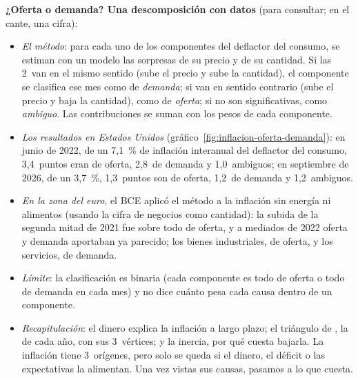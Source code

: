 \documentclass[11pt]{article}
\begin{document}
\begin{anotaciones}
\textbf{¿Oferta o demanda? Una descomposición con datos} (para consultar; en el cante, una cifra):
\begin{itemize}
\item \emph{El método}\nocite{Shapiro2022Oferta}: para cada uno de los componentes del deflactor del consumo, se estiman con un modelo las sorpresas de su precio y de su cantidad. Si las 2~van en el mismo sentido (sube el precio y sube la cantidad), el componente se clasifica ese mes como de \emph{demanda}; si van en sentido contrario (sube el precio y baja la cantidad), como de \emph{oferta}; si no son significativas, como \emph{ambiguo}. Las contribuciones se suman con los pesos de cada componente.
\item \emph{Los resultados en Estados Unidos} (gráfico~\ref{fig:inflacion-oferta-demanda}): en junio de 2022, de un 7,1~\% de inflación interanual del deflactor del consumo, 3,4~puntos eran de oferta, 2,8~de demanda y 1,0~ambiguos; en septiembre de 2026, de un 3,7~\%, 1,3~puntos son de oferta, 1,2~de demanda y 1,2~ambiguos\nocite{FRBSF2026OfertaDemanda}.
\item \emph{En la zona del euro}, el BCE aplicó el método a la inflación sin energía ni alimentos (usando la cifra de negocios como cantidad): la subida de la segunda mitad de 2021 fue sobre todo de oferta, y a mediados de 2022 oferta y demanda aportaban ya parecido; los bienes industriales, de oferta, y los servicios, de demanda\nocite{GoncalvesKoester2022}.
\item \emph{Límite}: la clasificación es binaria (cada componente es todo de oferta o todo de demanda en cada mes) y no dice cuánto pesa cada causa dentro de un componente.
\end{itemize}
\begin{figuracaja}
\caption{Inflación de oferta y de demanda en Estados Unidos, 2019-2026}\label{fig:inflacion-oferta-demanda}
\end{figuracaja}
\end{anotaciones}

\begin{itemize}
\item \emph{Recapitulación}: el dinero explica la inflación a largo plazo; el triángulo de , la de cada año, con sus 3~vértices; y la inercia, por qué cuesta bajarla. La inflación tiene 3~orígenes, pero solo se queda si el dinero, el déficit o las expectativas la alimentan. Una vez vistas sus causas, pasamos a lo que cuesta.
\end{itemize}
\end{document}
